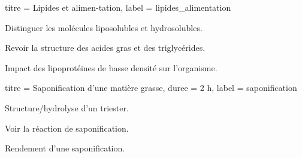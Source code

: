 \begin{multicols}{2}
  \begin{activite}{titre = Lipides et alimen-tation, label = lipides_alimentation}
    \begin{prerequis}
      \item Distinguer les molécules liposolubles et hydrosolubles.
    \end{prerequis}
    \begin{objectifs}
      \item Revoir la structure des acides gras et des triglycérides.
      \item Impact des lipoprotéines de basse densité sur l'organisme.
    \end{objectifs}
  \end{activite}
  \smallskip
  
  \begin{TP}{titre = Saponification d'une matière grasse, duree = 2 h, label = saponification}
    \begin{prerequis}
      \item Structure/hydrolyse d'un triester.
    \end{prerequis}
    \begin{objectifs}
      \item Voir la réaction de saponification.
      \item Rendement d'une saponification.
    \end{objectifs}
  \end{TP}  
\end{multicols}

\vspace*{-2cm}



\newpage
\nomPrenomClasse
{}
\vspace*{12pt}


\begin{programmeSeance}
  \seance \seance \seance
\end{programmeSeance}

\begin{programmeSeance}
  \seance \seance \seance
\end{programmeSeance}

